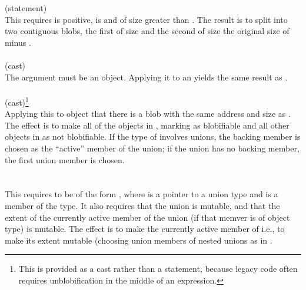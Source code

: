 \documentclass[preprint,nocopyrightspace]{sigplanconf}
\begin{document}
{{{\\\\
 (statement)\\
This requires  is positive,  is \vcc{\mutable} and of size greater
than . The result is to split  into two contiguous
blobs, the first of size  and the second of size the original
size of  minus .
\\\\
 (cast)\\
The argument must be an object.
Applying it to an  yields
the same result as .
\\\\
 (cast)\footnote{
This is provided as a cast rather than a statement, because
legacy code often requires unblobification in the middle of an expression.}\\
Applying this to object 
 that there is a \vcc{\wrapped} blob with the same
address and size as . The effect is to make all of the objects
in  \vcc{\mutable}, marking  as blobifiable and
all other objects in  as not blobifiable. If
the type of  involves unions, the backing member is chosen as
the ``active'' member of the union; if the union has no backing
member, the first union member is chosen.
\\\\
\\
This requires  to be of the form , where  is
a pointer to a union type and  is a member of the type. It also
requires that the union is mutable, and that the extent of the currently active
member of the union (if that memver is of object type) is mutable. The effect
is to make  the currently active member of  i.e., to make
its extent mutable (choosing union members of nested unions as
in . 

}}}
\end{document}
